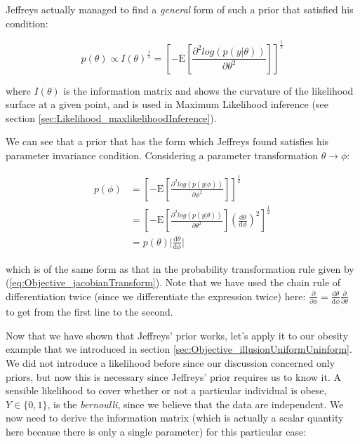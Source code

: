 \documentclass[11pt,fullpage]{book}
\begin{document}
Jeffreys actually managed to find a \textit{general} form of such a prior that satisfied his condition:

\begin{equation}\label{eq:Objective_jeffreysPrior}
p(\theta)\propto I(\theta)^{\frac{1}{2}} = \left[-\mathrm{E}\left[\frac{\partial^2 log(p(y|\theta))}{\partial \theta^2}\right]\right]^{\frac{1}{2}}
\end{equation}

where $I(\theta)$ is the information matrix and shows the curvature of the likelihood surface at a given point, and is used in Maximum Likelihood inference (see section \ref{sec:Likelihood_maxlikelihoodInference}). 

We can see that a prior that has the form which Jeffreys found satisfies his parameter invariance condition. Considering a parameter transformation $\theta\rightarrow\phi$:

\begin{equation}
\begin{align}
p(\phi) &= \left[-\mathrm{E}\left[\frac{\partial^2 log(p(y|\phi))}{\partial \phi^2}\right]\right]^{\frac{1}{2}}\\
&= \left[-\mathrm{E}\left[\frac{\partial^2 log(p(y|\theta))}{\partial \theta^2}\right]\left(\frac{\mathrm{d}\theta}{\mathrm{d}\phi}\right)^2\right]^{\frac{1}{2}}\\
&= p(\theta) \lvert\frac{\mathrm{d}\theta}{\mathrm{d}\phi}\lvert
\end{align}
\end{equation}

which is of the same form as that in the probability transformation rule given by (\ref{eq:Objective_jacobianTransform}). Note that we have used the chain rule of differentiation twice (since we differentiate the expression twice) here: $\frac{\partial}{\partial\phi} = \frac{\mathrm{d}\theta}{\mathrm{d}\phi} \frac{\partial}{\partial\theta}$ to get from the first line to the second.

Now that we have shown that Jeffreys' prior works, let's apply it to our obesity example that we introduced in section \ref{sec:Objective_illusionUniformUninform}. We did not introduce a likelihood before since our discussion concerned only priors, but now this is necessary since Jeffreys' prior requires us to know it. A sensible likelihood to cover whether or not a particular individual is obese, $Y\in\{0,1\}$, is the \textit{bernoulli}, since we believe that the data are independent. We now need to derive the information matrix (which is actually a scalar quantity here because there is only a single parameter) for this particular case:
\end{document}
